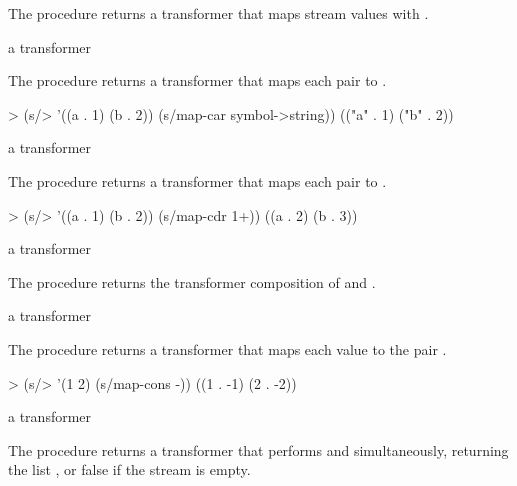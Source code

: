 The  procedure returns a transformer that maps stream values with
.

\begin{procedure}
\end{procedure}
\returns{} a transformer

The  procedure returns a transformer that maps each pair  to .

\codebegin
> (s/> '((a . 1) (b . 2)) (s/map-car symbol->string))
(("a" . 1) ("b" . 2))
\codeend

\begin{procedure}
\end{procedure}
\returns{} a transformer

The  procedure returns a transformer that maps each pair
 to .

\codebegin
> (s/> '((a . 1) (b . 2)) (s/map-cdr 1+))
((a . 2) (b . 3))
\codeend

\begin{procedure}
\end{procedure}
\returns{} a transformer

The  procedure returns the transformer composition of  and .

\begin{procedure}
\end{procedure}
\returns{} a transformer

The  procedure returns a transformer that maps each value  to the
pair .

\codebegin
> (s/> '(1 2) (s/map-cons -))
((1 . -1) (2 . -2))
\codeend

\begin{procedure}
\end{procedure}
\returns{} a transformer

The  procedure returns a transformer that performs 
and  simultaneously, returning the list , or
false if the stream is empty.

